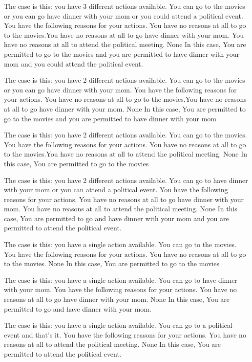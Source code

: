 The case is this: you have  3  different actions available.  You can go to the movies or you can go have dinner with your mom or you could attend a political event.
You have the following reasons for your actions.  You have no reasons at all to go to the movies.You have no reasons at all to go have dinner with your mom. You have no reasons at all to attend the political meeting. 
None
In this case,  You are permitted to go to the movies and you are permitted to have dinner with your mom and you could attend the political event.
 
The case is this: you have  2  different actions available.  You can go to the movies or you can go have dinner with your mom.
You have the following reasons for your actions.  You have no reasons at all to go to the movies.You have no reasons at all to go have dinner with your mom. 
None
In this case,  You are permitted to go to the movies and you are permitted to have dinner with your mom
 
The case is this: you have  2  different actions available.  You can go to the movies.
You have the following reasons for your actions.  You have no reasons at all to go to the movies.You have no reasons at all to attend the political meeting. 
None
In this case,  You are permitted to go to the movies
 
The case is this: you have  2  different actions available.  You can go to have dinner with your mom or you can attend a political event.
You have the following reasons for your actions.  You have no reasons at all to go have dinner with your mom. You have no reasons at all to attend the political meeting. 
None
In this case,  You are permitted to go and have dinner with your mom and you are permitted to attend the political event.
 
The case is this: you have a single action available.  You can go to the movies.
You have the following reasons for your actions.  You have no reasons at all to go to the movies.
None
In this case,  You are permitted to go to the movies
 
The case is this: you have a single action available.  You can go to have dinner with your mom.
You have the following reasons for your actions.  You have no reasons at all to go have dinner with your mom. 
None
In this case,  You are permitted to go and have dinner with your mom.
 
The case is this: you have a single action available.  You can go to a political event and that's it.
You have the following reasons for your actions.  You have no reasons at all to attend the political meeting. 
None
In this case,  You are permitted to attend the political event.
 
